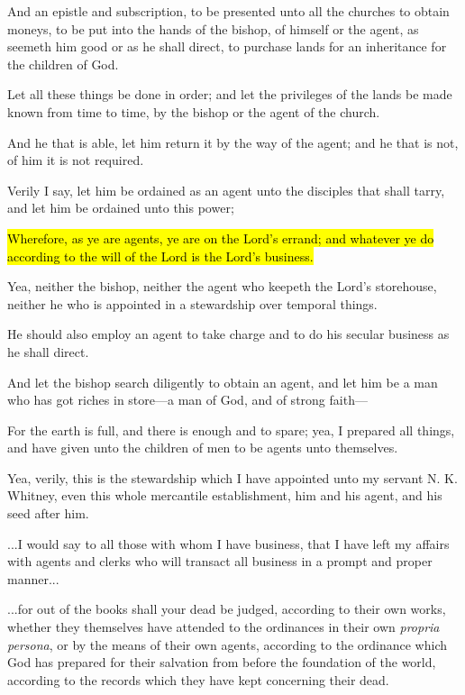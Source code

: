 \begin{compactdesc}
				\item[{\hyperref[DC58-51]{DC 58:51}}] And an epistle and subscription, to be presented unto all the churches to obtain moneys, to be put into the hands of the bishop, of himself or the agent, as seemeth him good or as he shall direct, to purchase lands for an inheritance for the children of God.
				\item[{\hyperref[DC58-55]{DC 58:55}}] Let all these things be done in order; and let the privileges of the lands be made known from time to time, by the bishop or the agent of the church.
				\item[{\hyperref[DC60-11]{DC 60:11}}] And he that is able, let him return it by the way of the agent; and he that is not, of him it is not required.
				\item[{\hyperref[DC63-45]{DC 63:45}}] Verily I say, let him be ordained as an agent unto the disciples that shall tarry, and let him be ordained unto this power;
				\item[{\hyperref[DC64-29]{DC 64:29}}] \hl{Wherefore, as ye are agents, ye are on the Lord's errand; and whatever ye do according to the will of the Lord is the Lord's business.}
				\item[{\hyperref[DC70-11]{DC 70:11}}] Yea, neither the bishop, neither the agent who keepeth the Lord's storehouse, neither he who is appointed in a stewardship over temporal things.
				\item[{\hyperref[DC84-113]{DC 84:113}}] He should also employ an agent to take charge and to do his secular business as he shall direct.
				\item[{\hyperref[DC90-22]{DC 90:22}}] And let the bishop search diligently to obtain an agent, and let him be a man who has got riches in store---a man of God, and of strong faith---
				\item[{\hyperref[DC104-17]{DC 104:17}}] For the earth is full, and there is enough and to spare; yea, I prepared all things, and have given unto the children of men to be agents unto themselves.
				\item[{\hyperref[DC104-41]{DC 104:41}}] Yea, verily, this is the stewardship which I have appointed unto my servant N. K. Whitney, even this whole mercantile establishment, him and his agent, and his seed after him.
				\item[{\hyperref[DC127-1]{DC 127:1}}] ...I would say to all those with whom I have business, that I have left my affairs with agents and clerks who will transact all business in a prompt and proper manner...
				\item[{\hyperref[DC128-8]{DC 128:8}}] ...for out of the books shall your dead be judged, according to their own works, whether they themselves have attended to the ordinances in their own \textit{propria persona}, or by the means of their own agents, according to the ordinance which God has prepared for their salvation from before the foundation of the world, according to the records which they have kept concerning their dead.
			\end{compactdesc}
			
